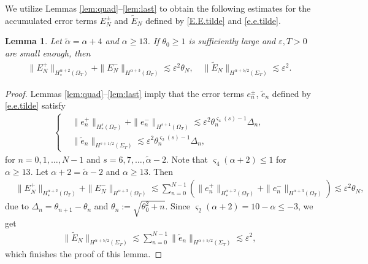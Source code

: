 \documentclass[twoside,11pt]{article}
\numberwithin{equation}{section}
\newtheorem{lemma}{Lemma}[section]
\begin{document}
We utilize Lemmas \ref{lem:quad}--\ref{lem:last} to obtain the following estimates for the accumulated error terms $E_{N}^{\pm}$ and $\widetilde{E}_N $ defined by \eqref{E.E.tilde} and \eqref{e.e.tilde}.
\begin{lemma} \label{lem:sum2}
	Let $\widetilde{\alpha}={\alpha }+4$ and ${\alpha }\geq 13$.
	If $\theta_0\geq 1$ is sufficiently  large and $\varepsilon,T>0$ are small enough, then	
	\begin{align} \label{es.sum2}
		\|E_{N}^+\|_{H_*^{{\alpha }+2}(\Omega_{T})}+\|E_{N}^-\|_{H^{{\alpha }+3}(\Omega_{T})}
		\lesssim \varepsilon^2 \theta_{{N}},\quad
		\| \widetilde{E}_{{N}} \|_{H^{{\alpha }+5/2}(\Sigma_{T})}\lesssim \varepsilon^2.
	\end{align}
\end{lemma}
\begin{proof}
	Lemmas \ref{lem:quad}--\ref{lem:last} imply that the error terms $e_{n}^{\pm}$, $\tilde{e}_n$ defined by \eqref{e.e.tilde} satisfy
	\begin{align} \label{es.sum1a}
		\left\{
		\begin{aligned}
			&	\|e_{n}^+ \|_{H_*^s(\Omega_{T})}+\|e_{n}^- \|_{H^{s+1}(\Omega_{T})}
			\lesssim \varepsilon^2 \theta_n^{\varsigma_4(s)-1}\varDelta_n,\\[1mm]
			&	\|\tilde{e}_n\|_{H^{s+1/2}(\Sigma_T)}
			\lesssim \varepsilon^2 \theta_n^{\varsigma_2(s)-1}\varDelta_n,
		\end{aligned}
		\right.
	\end{align}	
	for $n=0,1,\ldots,{N}-1 $ and $s=6,7,\ldots,\widetilde{\alpha}-2$.
	Note that $\varsigma_4({\alpha }+2)\leq 1$ for $\alpha\geq 13$.
	Let ${\alpha }+2= \widetilde{\alpha}-2$ and ${\alpha }\geq 13$. Then
	\begin{align*}
		&\|E_{{N}}^+\|_{H_*^{\alpha+2}(\Omega_{T})}+\|E_{N}^-\|_{H^{{\alpha }+3}(\Omega_{T})}
		\lesssim \sum_{n=0}^{{N}-1}\left( \|e_{n}^+ \|_{H_*^{\alpha+2}(\Omega_{T})}
		+\|e_{n}^-\|_{H^{{\alpha }+3}(\Omega_{T})}\right)
		\lesssim \varepsilon^2\theta_{{N}},
	\end{align*}
	due to  $\varDelta_n=\theta_{n+1}-\theta_n$ and $\theta_{{n}}:=\sqrt{\theta^2_0+{n}}$.
	Since $\varsigma_2({\alpha }+2)=10-{\alpha }\leq -3$, we get
	\begin{align*}
		\|\widetilde{E}_{{N}}\|_{H^{{\alpha }+5/2}(\Sigma_T)}
		\lesssim \sum_{n=0}^{{N}-1} \|\tilde{e}_{n} \|_{H^{{\alpha }+5/2}(\Sigma_T)}
		\lesssim \varepsilon^2,
	\end{align*}
	which finishes the proof of this lemma.
\end{proof}
\end{document}
